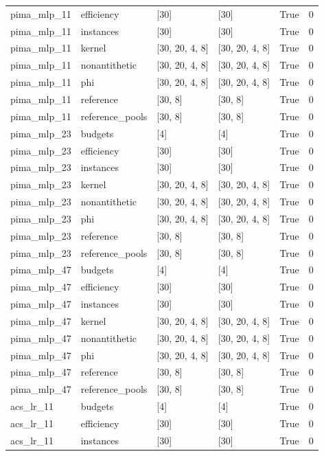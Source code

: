 \begin{tabular}{llllll}
pima\_mlp\_11 & efficiency & [30] & [30] & True & 0 \\
pima\_mlp\_11 & instances & [30] & [30] & True & 0 \\
pima\_mlp\_11 & kernel & [30, 20, 4, 8] & [30, 20, 4, 8] & True & 0 \\
pima\_mlp\_11 & nonantithetic & [30, 20, 4, 8] & [30, 20, 4, 8] & True & 0 \\
pima\_mlp\_11 & phi & [30, 20, 4, 8] & [30, 20, 4, 8] & True & 0 \\
pima\_mlp\_11 & reference & [30, 8] & [30, 8] & True & 0 \\
pima\_mlp\_11 & reference\_pools & [30, 8] & [30, 8] & True & 0 \\
pima\_mlp\_23 & budgets & [4] & [4] & True & 0 \\
pima\_mlp\_23 & efficiency & [30] & [30] & True & 0 \\
pima\_mlp\_23 & instances & [30] & [30] & True & 0 \\
pima\_mlp\_23 & kernel & [30, 20, 4, 8] & [30, 20, 4, 8] & True & 0 \\
pima\_mlp\_23 & nonantithetic & [30, 20, 4, 8] & [30, 20, 4, 8] & True & 0 \\
pima\_mlp\_23 & phi & [30, 20, 4, 8] & [30, 20, 4, 8] & True & 0 \\
pima\_mlp\_23 & reference & [30, 8] & [30, 8] & True & 0 \\
pima\_mlp\_23 & reference\_pools & [30, 8] & [30, 8] & True & 0 \\
pima\_mlp\_47 & budgets & [4] & [4] & True & 0 \\
pima\_mlp\_47 & efficiency & [30] & [30] & True & 0 \\
pima\_mlp\_47 & instances & [30] & [30] & True & 0 \\
pima\_mlp\_47 & kernel & [30, 20, 4, 8] & [30, 20, 4, 8] & True & 0 \\
pima\_mlp\_47 & nonantithetic & [30, 20, 4, 8] & [30, 20, 4, 8] & True & 0 \\
pima\_mlp\_47 & phi & [30, 20, 4, 8] & [30, 20, 4, 8] & True & 0 \\
pima\_mlp\_47 & reference & [30, 8] & [30, 8] & True & 0 \\
pima\_mlp\_47 & reference\_pools & [30, 8] & [30, 8] & True & 0 \\
acs\_lr\_11 & budgets & [4] & [4] & True & 0 \\
acs\_lr\_11 & efficiency & [30] & [30] & True & 0 \\
acs\_lr\_11 & instances & [30] & [30] & True & 0 \\

\end{tabular}

